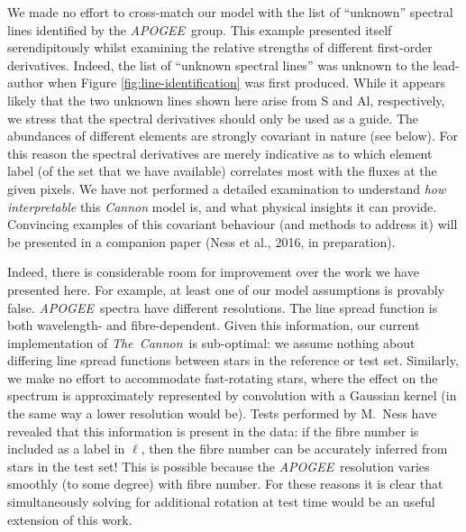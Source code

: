 \documentclass[12pt,preprint]{aastex}
\newcommand{\project}[1]{\textsl{#1}}
\newcommand{\TheCannon}{\project{The~Cannon}}
\newcommand{\acronym}[1]{{\small{#1}}}
\newcommand{\apogee}{\project{\acronym{APOGEE}}}
\begin{document}
We made no effort to cross-match our model with the list of ``unknown'' spectral lines
identified by the \apogee\ group.  This example presented itself
serendipitously whilst examining the relative strengths of different
first-order derivatives.  Indeed, the list of ``unknown spectral lines''
was unknown to the lead-author when Figure \ref{fig:line-identification} was first produced.  While it appears
likely that the two unknown lines shown here arise from S and Al, respectively,
we stress that the spectral derivatives should only be used as a guide.  The
abundances of different elements are strongly covariant in nature (see below).
For this reason the spectral derivatives are merely indicative as to
which element label (of the set that we have available) correlates
most with the fluxes at the given pixels.  We have not performed
a detailed examination to understand \emph{how interpretable} this
\emph{Cannon} model is, and what physical insights it can provide. 
Convincing examples of this covariant behaviour (and methods to address
it) will be presented in a companion paper (Ness et al., 2016, in preparation). 


Indeed, there is considerable room for improvement over the work
we have presented here.  For example, at least one of our model 
assumptions is provably false. \apogee\ spectra have
different resolutions.  The line spread function is both wavelength- and 
fibre-dependent.  Given this information, our current implementation of \TheCannon\ is  
sub-optimal: we assume nothing about differing line spread functions between 
stars in the reference or test set.  Similarly, we make no effort to 
accommodate fast-rotating stars, where the effect on the spectrum is 
approximately represented by convolution with a Gaussian kernel (in the same way
a lower resolution would be).  Tests performed by M.~Ness have revealed that 
this information is present in the data: if the fibre number is included as a
label in $\ell$, then the fibre number can be accurately inferred from stars
in the test set!  This is possible because the 
\apogee\ resolution varies smoothly (to some degree) with fibre number.  For 
these reasons it is clear that simultaneously solving for additional rotation
at test time would be an useful extension of this work.  
\end{document}
